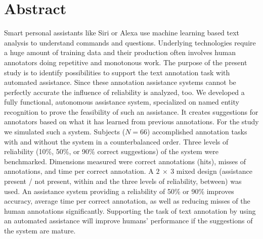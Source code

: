 \section*{Abstract}
	Smart personal assistants like Siri or Alexa use machine learning based text analysis to understand commands and questions. Underlying technologies require a huge amount of training data and their production often involves human annotators doing repetitive and monotonous work.
	The purpose of the present study is to identify possibilities to support the text annotation task with automated assistance. Since these annotation assistance systems cannot be perfectly accurate the influence of reliability is analyzed, too.
	We developed a fully functional, autonomous assistance system, specialized on named entity recognition to prove the feasibility of such an assistance. It creates suggestions for annotators based on what it has learned from previous annotations.
	For the study we simulated such a system. Subjects ($N = 66$) accomplished annotation tasks with and without the system in a counterbalanced order. Three levels of reliability (10\%, 50\%, or 90\% correct suggestions) of the system were benchmarked. Dimensions measured were correct annotations (hits), misses of annotations, and time per correct annotation. A $2\ \times\ 3$ mixed design (assistance present / not present, within and the three levels of reliability, between) was used.
	An assistance system providing a reliability of 50\% or 90\% improves accuracy, average time per correct annotation, as well as reducing misses of the human annotations significantly.
	Supporting the task of text annotation by using an automated assistance will improve humans’ performance if the suggestions of the system are mature.

\pagebreak

